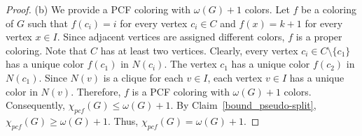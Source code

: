 \documentclass[10pt,a4paper]{amsart}
\begin{document}
\begin{proof}
	(b) We provide a PCF coloring with $\omega(G)+1$ colors. Let $f$ be a coloring of $G$ such that $f(c_i) = i$ for every vertex $c_i\in C$ and $f(x) = k+1$ for every vertex $x\in I$. Since adjacent vertices are assigned different colors, $f$ is a proper coloring. Note that $C$ has at least two vertices.
	Clearly, every vertex $c_i\in C\setminus\{c_1\}$ has a unique color $f(c_1)$ in $N(c_i)$. The vertex $c_1$ has a unique color $f(c_2)$ in $N(c_1)$.
	Since $N(v)$ is a clique for each $v\in I$, each vertex $v\in I$ has a unique color in $N(v)$. Therefore, $f$ is a PCF coloring with $\omega(G)+1$ colors. Consequently, $\chi_{pcf}(G)\leq\omega(G)+1$. By Claim~\ref{bound_pseudo-split}, $\chi_{pcf}(G)\geq\omega(G)+1$. 
	Thus, $\chi_{pcf}(G) = \omega(G)+1$.
\end{proof}
\end{document}
